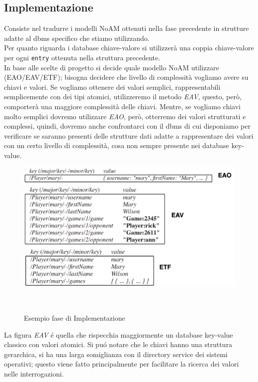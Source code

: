 \subsection{Implementazione}
Consiste nel tradurre i modelli NoAM ottenuti nella fase precedente in strutture adatte al dbms specifico che stiamo utilizzando.\\
Per quanto riguarda i database chiave-valore si utilizzerà una coppia chiave-valore per ogni \texttt{entry} ottenuta nella struttura
precedente.\\
In base alle scelte di progetto si decide quale modello NoAM utilizzare (EAO/EAV/ETF); bisogna decidere che livello di
complessità vogliamo avere su chiavi e valori.
Se vogliamo ottenere dei valori semplici, rappresentabili semplicemente con dei tipi atomici, utilizzeremo il metodo \emph{EAV}, questo, però, comporterà una maggiore complessità delle chiavi.
Mentre, se vogliamo chiavi molto semplici dovremo utilizzare \emph{EAO}, però, otterremo dei valori strutturati e complessi, quindi, dovremo anche confrontarci con
il dbms di cui disponiamo per verificare se saranno presenti delle strutture dati adatte a rappresentare dei valori con un certo livello di complessità, cosa non sempre
presente nei database key-value.\\

\begin{figure}[H]
    \begin{center}
        \includegraphics[width=1\textwidth]{img/implementazione}
    \end{center}
\caption{Esempio fase di Implementazione}\\
\end{figure}

La figura \emph{EAV} é quella che rispecchia maggiormente un database key-value classico con valori atomici.
Si puó notare che le chiavi hanno una struttura gerarchica, si ha una larga somiglianza con il directory service dei sistemi operativi;
questo viene fatto principalmente per facilitare la ricerca dei valori nelle interrogazioni.


